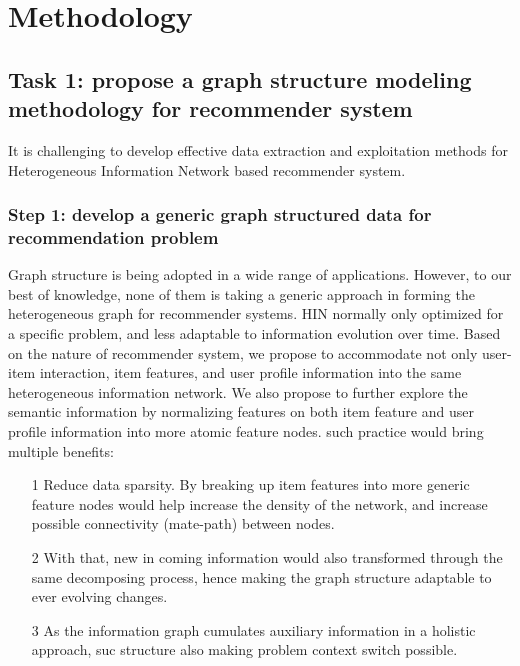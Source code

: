 \section{Methodology}

\subsection{Task 1: propose a graph structure modeling methodology for recommender system}
It is challenging to develop effective data extraction and exploitation methods for Heterogeneous Information Network based recommender system.

\subsubsection*{Step 1: develop a generic graph structured data for recommendation problem}

Graph structure is being adopted in a wide range of applications. However, to our best of knowledge, none of them is taking a generic approach in forming the heterogeneous graph for recommender systems. HIN normally only optimized for a specific problem, and less adaptable to information evolution over time. 
Based on the nature of recommender system, we propose to accommodate not only user-item interaction, item features, and user profile information into the same heterogeneous information network. We also propose to further explore the semantic information by normalizing features on both item feature and user profile information into more atomic feature nodes. such practice would bring multiple benefits: 

\begin{itemize}
    
\item[1] Reduce data sparsity. By breaking up item features into more generic feature nodes would help increase the density of the network, and increase possible connectivity (mate-path) between nodes.

\item[2] With that, new in coming information would also transformed through the same decomposing process, hence making the graph structure adaptable to ever evolving changes.

\item[3] As the information graph cumulates auxiliary information in a holistic approach, suc structure also making problem context switch possible.

\end{itemize}

